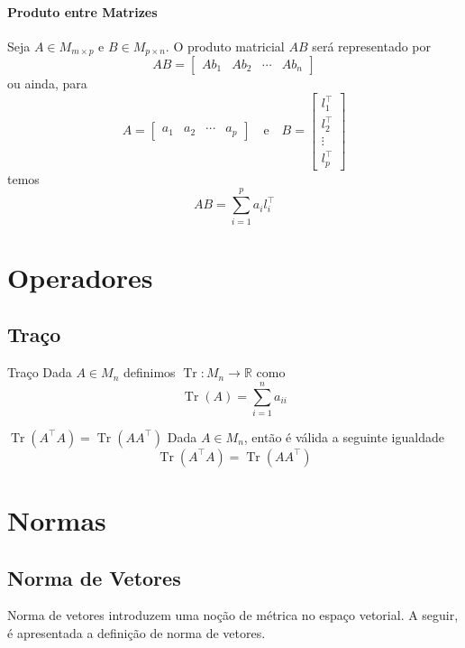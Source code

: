 \documentclass[12pt,openany]{book}
\newcommand{\R}{\mathbb{R}}
\DeclareMathOperator{\tr}{Tr}
\begin{document}
\subsubsection*{Produto entre Matrizes}
Seja $A \in M_{m \times p}$ e $B \in M_{p \times n}$.
O produto matricial $AB$ será representado por
\[
    AB =    \begin{bmatrix}
                Ab_1 & Ab_2 & \cdots & Ab_n
            \end{bmatrix}
\]
ou ainda, para
\[
    A = \begin{bmatrix}
            a_1 & a_2 & \cdots & a_p
        \end{bmatrix}
    \quad \text{e} \quad
    B = \begin{bmatrix}
            l_1^\top \\
            l_2^\top \\
            \vdots \\
            l_p^\top
        \end{bmatrix}
\]
temos
\[
    AB = \sum_{i = 1}^{p }a_il_i^\top
\]

\chapter*{Operadores}
\section*{Traço}
\begin{definition}{Traço}{}
    Dada $A \in M_n$ definimos $\tr \colon M_n \to \R$ como
    \[
        \tr(A) = \sum_{i = 1}^{n} a_{ii}
    \]
\end{definition}

\begin{theorem}{$\tr(A^\top A) = \tr(AA^\top)$}{}
    Dada $A \in M_n$, então é válida a seguinte igualdade
    \[
        \tr(A^\top A) = \tr(AA^\top)
    \]
\end{theorem}

\mainmatter

\chapter{Normas}
\section{Norma de Vetores}
Norma de vetores introduzem uma noção de métrica no espaço vetorial.
A seguir, é apresentada a definição de norma de vetores.
\end{document}
